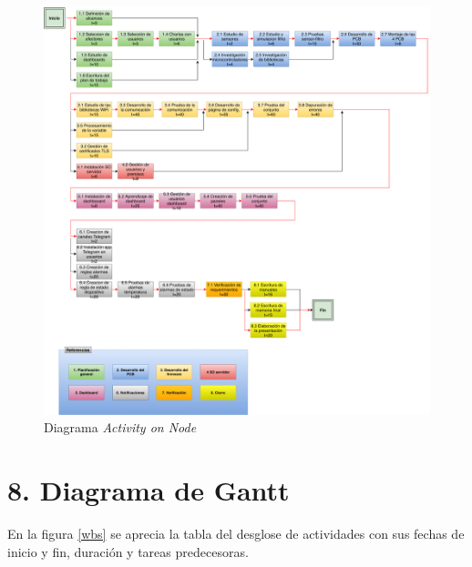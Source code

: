 \documentclass[11pt]{charter}
\begin{document}
\begin{figure}[htpb]
\centering 
\includegraphics[width=1\textwidth]{./Figuras/act_on_node_1.pdf}
\caption{Diagrama \textit{Activity on Node}}
\label{fig:AoN}
\end{figure}






\section{8. Diagrama de Gantt}
\label{sec:gantt}

En la figura \ref{wbs} se aprecia la tabla del desglose de actividades con sus fechas de inicio y fin, duración y tareas predecesoras.

\end{document}
